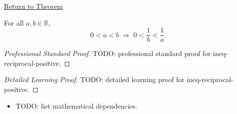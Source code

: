 \newpage
{}
\label{prf:ineq-reciprocal-positive}

\begin{remark*}[Return]
\hyperref[thm:ineq-reciprocal-positive]{Return to Theorem}
\end{remark*}

\begin{theorem*}
For all $a, b \in \mathbb{R}$,
\[
  0 < a < b \;\Rightarrow\; 0 < \frac{1}{b} < \frac{1}{a}.
\]
\end{theorem*}

\begin{proof}[Professional Standard Proof]
\LRAProofBodyStart
TODO: professional standard proof for ineq-reciprocal-positive.
\end{proof}

\begin{proof}[Detailed Learning Proof]
\LRAProofBodyStart
TODO: detailed learning proof for ineq-reciprocal-positive.
\end{proof}

\begin{remark*}
\end{remark*}

\begin{dependencies}
\begin{itemize}
  \item TODO: list mathematical dependencies.
\end{itemize}
\end{dependencies}

\clearpage
